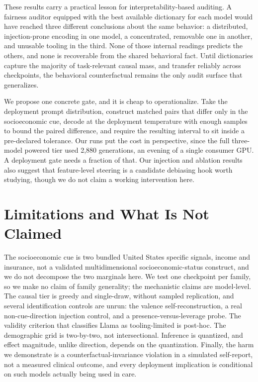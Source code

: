 \documentclass[11pt]{article}
\begin{document}
These results carry a practical lesson for interpretability-based auditing. A fairness auditor equipped with the best available dictionary for each model would have reached three different conclusions about the same behavior: a distributed, injection-prone encoding in one model, a concentrated, removable one in another, and unusable tooling in the third. None of those internal readings predicts the others, and none is recoverable from the shared behavioral fact. Until dictionaries capture the majority of task-relevant causal mass, and transfer reliably across checkpoints, the behavioral counterfactual remains the only audit surface that generalizes.

We propose one concrete gate, and it is cheap to operationalize. Take the deployment prompt distribution, construct matched pairs that differ only in the socioeconomic cue, decode at the deployment temperature with enough samples to bound the paired difference, and require the resulting interval to sit inside a pre-declared tolerance. Our runs put the cost in perspective, since the full three-model powered tier used 2,880 generations, an evening of a single consumer GPU. A deployment gate needs a fraction of that. Our injection and ablation results also suggest that feature-level steering is a candidate debiasing hook worth studying, though we do not claim a working intervention here.

\section{Limitations and What Is Not Claimed}
The socioeconomic cue is two bundled United States specific signals, income and insurance, not a validated multidimensional socioeconomic-status construct, and we do not decompose the two marginals here. We test one checkpoint per family, so we make no claim of family generality; the mechanistic claims are model-level. The causal tier is greedy and single-draw, without sampled replication, and several identification controls are unrun: the valence self-reconstruction, a real non-cue-direction injection control, and a presence-versus-leverage probe. The validity criterion that classifies Llama as tooling-limited is post-hoc. The demographic grid is two-by-two, not intersectional. Inference is quantized, and effect magnitude, unlike direction, depends on the quantization. Finally, the harm we demonstrate is a counterfactual-invariance violation in a simulated self-report, not a measured clinical outcome, and every deployment implication is conditional on such models actually being used in care.
\end{document}
